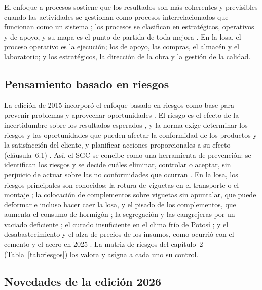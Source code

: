 El enfoque a procesos sostiene que los resultados son más coherentes y previsibles cuando las actividades se gestionan como procesos interrelacionados que funcionan como un sistema \parencite[p.~59]{pena2024}; los procesos se clasifican en estratégicos, operativos y de apoyo, y su mapa es el punto de partida de toda mejora \parencite[pp.~18, 50]{zurita2024}. En la losa, el proceso operativo es la ejecución; los de apoyo, las compras, el almacén y el laboratorio; y los estratégicos, la dirección de la obra y la gestión de la calidad.

\subsection{Pensamiento basado en riesgos}

La edición de 2015 incorporó el enfoque basado en riesgos como base para prevenir problemas y aprovechar oportunidades \parencite[p.~20]{mamanicalsina2025}. El riesgo es el efecto de la incertidumbre sobre los resultados esperados \parencite[p.~22]{mamanicalsina2025}, y la norma exige determinar los riesgos y las oportunidades que pueden afectar la conformidad de los productos y la satisfacción del cliente, y planificar acciones proporcionales a su efecto (cláusula~6.1) \parencite{iso9001_2026}. Así, el SGC se concibe como una herramienta de prevención: se identifican los riesgos y se decide cuáles eliminar, controlar o aceptar, sin perjuicio de actuar sobre las no conformidades que ocurran \parencite[pp.~57--58]{pena2024}. En la losa, los riesgos principales son conocidos: la rotura de viguetas en el transporte o el montaje \parencite[p.~116]{alcon2009}; la colocación de complementos sobre viguetas sin apuntalar, que puede deformar e incluso hacer caer la losa, y el pisado de los complementos, que aumenta el consumo de hormigón \parencite[hoja~3]{concretec2016plastoformo}; la segregación y las cangrejeras por un vaciado deficiente \parencite[p.~17]{muro2020}; el curado insuficiente en el clima frío de Potosí \parencite[sección~26.5.4.2, p.~583]{aci318_2025}; y el desabastecimiento y el alza de precios de los insumos, como ocurrió con el cemento y el acero en 2025 \parencite{fancesa2025,laslomas2025}. La matriz de riesgos del capítulo~2 (Tabla~\ref{tab:riesgos}) los valora y asigna a cada uno su control.

\subsection{Novedades de la edición 2026}
\label{sec:iso2026}

